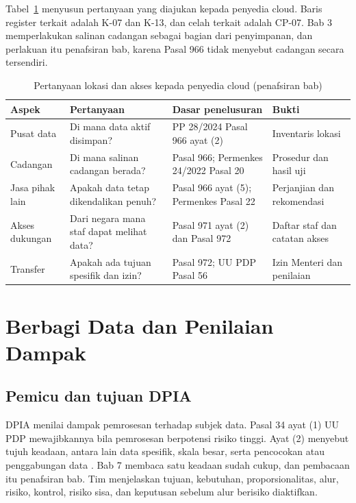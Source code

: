Tabel~\ref{tab:ch09-lokasi} menyusun pertanyaan yang diajukan kepada penyedia cloud. Baris register
terkait adalah K-07 dan K-13, dan celah terkait adalah CP-07. Bab 3 memperlakukan salinan cadangan
sebagai bagian dari penyimpanan, dan perlakuan itu penafsiran bab, karena Pasal 966 tidak menyebut
cadangan secara tersendiri.

\begin{table}[!htb]
  \centering\small
  \caption{Pertanyaan lokasi dan akses kepada penyedia cloud (penafsiran bab)}
  \label{tab:ch09-lokasi}
  \begin{tabularx}{\textwidth}{|>{\raggedright\arraybackslash}p{}|>{\raggedright\arraybackslash}X|>{\raggedright\arraybackslash}p{}|>{\raggedright\arraybackslash}X|}
    \hline
    \textbf{Aspek} & \textbf{Pertanyaan} & \textbf{Dasar penelusuran} & \textbf{Bukti} \\ \hline
    Pusat data & Di mana data aktif disimpan? & PP 28/2024 Pasal 966 ayat (2) & Inventaris lokasi \\
    \hline
    Cadangan & Di mana salinan cadangan berada? & Pasal 966; Permenkes 24/2022 Pasal 20 & Prosedur
    dan hasil uji \\ \hline
    Jasa pihak lain & Apakah data tetap dikendalikan penuh? & Pasal 966 ayat (5); Permenkes Pasal 22
    & Perjanjian dan rekomendasi \\ \hline
    Akses dukungan & Dari negara mana staf dapat melihat data? & Pasal 971 ayat (2) dan Pasal 972 &
    Daftar staf dan catatan akses \\ \hline
    Transfer & Apakah ada tujuan spesifik dan izin? & Pasal 972; UU PDP Pasal 56 & Izin Menteri dan
    penilaian \\ \hline
  \end{tabularx}
\end{table}

\section{Berbagi Data dan Penilaian Dampak}

\subsection*{Pemicu dan tujuan DPIA}

DPIA menilai dampak pemrosesan terhadap subjek data. Pasal 34 ayat (1) UU PDP mewajibkannya bila
pemrosesan berpotensi risiko tinggi. Ayat (2) menyebut tujuh keadaan, antara lain data spesifik,
skala besar, serta pencocokan atau penggabungan data \cite{uu27-2022-pdp}. Bab 7 membaca satu
keadaan sudah cukup, dan pembacaan itu penafsiran bab. Tim menjelaskan tujuan, kebutuhan,
proporsionalitas, alur, risiko, kontrol, risiko sisa, dan keputusan sebelum alur berisiko
diaktifkan.


